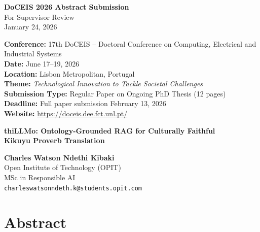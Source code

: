 \documentclass[11pt,a4paper]{article}
\begin{document}
\begin{center}
{\Large\bfseries DoCEIS 2026 Abstract Submission}\\[5pt]
{\large For Supervisor Review}\\[3pt]
{\small January 24, 2026}
\end{center}

\vspace{10pt}

\noindent\hrulefill

\noindent\textbf{Conference:} 17th DoCEIS -- Doctoral Conference on Computing, Electrical and Industrial Systems\\
\textbf{Date:} June 17--19, 2026\\
\textbf{Location:} Lisbon Metropolitan, Portugal\\
\textbf{Theme:} \textit{Technological Innovation to Tackle Societal Challenges}\\
\textbf{Submission Type:} Regular Paper on Ongoing PhD Thesis (12 pages)\\
\textbf{Deadline:} Full paper submission February 13, 2026\\
\textbf{Website:} \url{https://doceis.dee.fct.unl.pt/}

\noindent\hrulefill

\vspace{10pt}

\begin{center}
{\LARGE\bfseries thiLLMo: Ontology-Grounded RAG for Culturally Faithful\\Kikuyu Proverb Translation}
\end{center}

\vspace{5pt}

\begin{center}
\textbf{Charles Watson Ndethi Kibaki}\\
Open Institute of Technology (OPIT)\\
MSc in Responsible AI\\
\texttt{charleswatsonndeth.k@students.opit.com}
\end{center}

\vspace{10pt}

\section*{Abstract}
\end{document}
